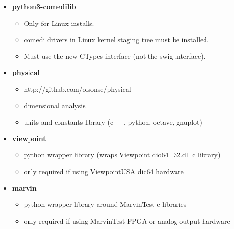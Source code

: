 \begin{itemize}
\begin{itemize}
      \item \textbf{python3-comedilib}
        \begin{itemize}
          \item Only for Linux installs.
          \item comedi drivers in Linux kernel staging tree must be installed.
          \item Must use the new CTypes interface (not the swig interface).
        \end{itemize}

      \item \textbf{physical}
        \begin{itemize}
          \item http://github.com/olsonse/physical
          \item dimensional analysis
          \item units and constants library (c++, python, octave, gnuplot)
        \end{itemize}

      \item \textbf{viewpoint}
        \begin{itemize}
          \item python wrapper library (wraps Viewpoint dio64\_32.dll c library)
          \item only required if using ViewpointUSA dio64 hardware
        \end{itemize}

      \item \textbf{marvin}
        \begin{itemize}
          \item python wrapper library around MarvinTest c-libraries
          \item only required if using MarvinTest FPGA or analog output hardware
        \end{itemize}
    \end{itemize}


\end{itemize}
